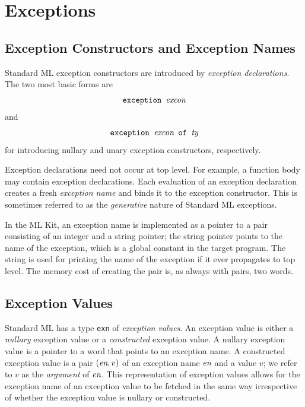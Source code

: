 \documentclass[12pt]{book}
\begin{document}
\chapter{Exceptions}
\label{exceptions.sec}

\section{Exception Constructors and Exception Names}
Standard ML
%
%
exception constructors are introduced by
%
% 
{\em exception declarations}. The two most basic forms are
$$\hbox{\tt exception {\it excon}}$$
and 
$$\hbox{\tt exception {\it excon} of {\it ty}}$$
for introducing nullary and unary exception constructors,
respectively. 

Exception declarations need not
occur at top level. For example, a function body may contain exception
declarations.  Each evaluation of an exception declaration creates a
fresh
%
%
{\em exception name\/} and binds it to the exception constructor. This
is sometimes referred to as the {\em generative\/} nature of Standard ML
exceptions.

In the ML Kit, an exception name is implemented as a pointer to a pair
consisting of an integer and a string pointer; the string pointer
points to the name of the exception, which is a global constant in the
target program. The string is used for printing the name of the
exception if it ever propagates to top level. The memory cost of creating
the pair is, as always with pairs, two words.

\section{Exception Values}
Standard ML has a type 
%
{\tt exn} of 
%
{\em exception values}.  An exception value is either a
%
{\em nullary\/} exception value or a 
%
{\em constructed\/} exception value. A nullary exception value is a
pointer to a word that points to an exception name. A constructed
exception value is a pair $(\hbox{\it en},v)$ of an exception name $\hbox{\it en}$
and a value $v$; we refer to $v$ as the {\em argument\/} of $\hbox{\it en}$.
This representation of exception values allows for the exception name
of an exception value to be fetched in the same way irrespective of whether the
exception value is nullary or constructed.
\end{document}
